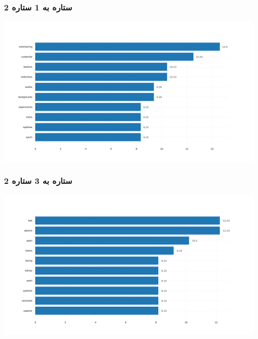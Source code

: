 \subsubsection{\Large 2 ستاره به 1 ستاره}
            { \selectfont \setLR
            \begin{center}
            \includegraphics[scale=0.4]{Images/rel_norm_freq_2_1.png}
            \end{center}
            \begin{adjustbox}{width=\textwidth}
            \end{adjustbox}
            }
\subsubsection{\Large 2 ستاره به 3 ستاره}
            { \selectfont \setLR
            \begin{center}
            \includegraphics[scale=0.4]{Images/rel_norm_freq_2_3.png}
            \end{center}
            \begin{adjustbox}{width=\textwidth}
            \end{adjustbox}
            }
